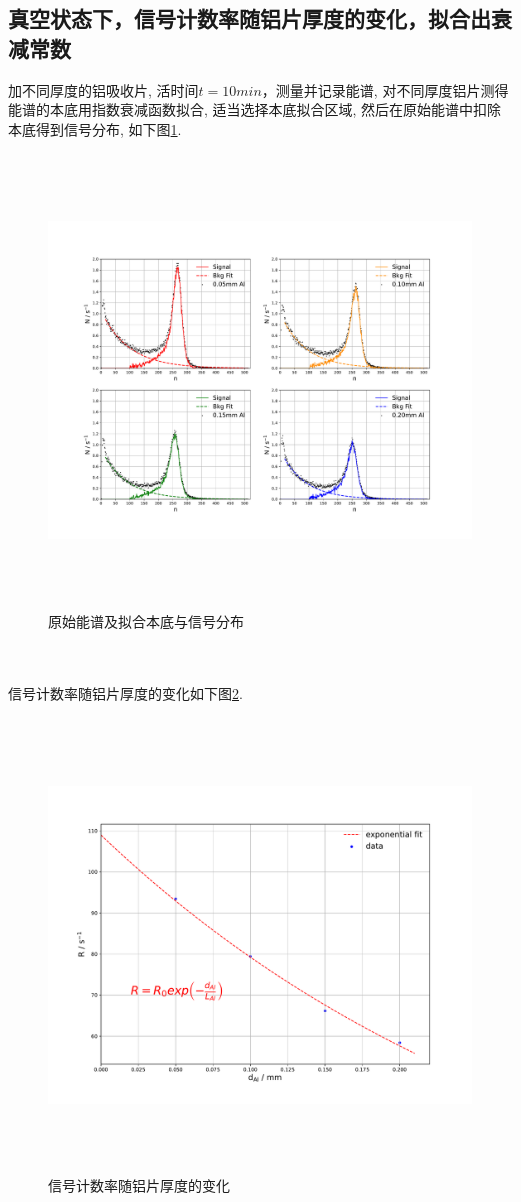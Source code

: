 \documentclass[a4paper]{article}
\begin{document}
\subsection{真空状态下，信号计数率随铝片厚度的变化，拟合出衰减常数}\label{sub:alu}
加不同厚度的铝吸收片, 活时间$t=10min$，测量并记录能谱, 对不同厚度铝片测得能谱的本底用指数衰减函数拟合, 适当选择本底拟合区域, 然后在原始能谱中扣除本底得到信号分布, 如下图\ref{fig:fig2}. 
\begin{figure}[ht]
 \centering
 \includegraphics[height=12cm, width=16cm]{images/phyex1_fig3.pdf}
 \caption{原始能谱及拟合本底与信号分布}
 \label{fig:fig2}
\end{figure}\\\\
\newpage
信号计数率随铝片厚度的变化如下图\ref{fig:fig3}. 
\begin{figure}[ht]
 \centering
 \includegraphics[height=12cm, width=16cm]{images/phyex1_fig4.pdf}
 \caption{信号计数率随铝片厚度的变化}
 \label{fig:fig3}
\end{figure}\\
\end{document}
